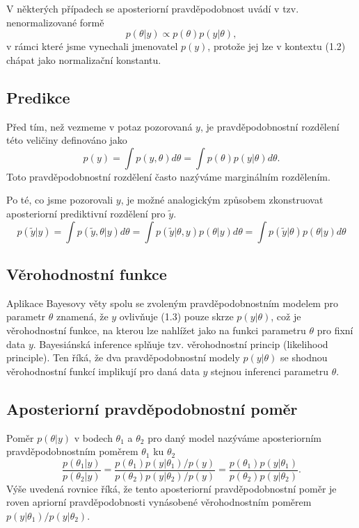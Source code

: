 V některých případech se aposteriorní pravděpodobnost uvádí v tzv. nenormalizované formě
\begin{equation}
p(\theta | y) \varpropto p(\theta)p(y|\theta),
\end{equation}
v rámci které jsme vynechali jmenovatel $p(y)$, protože jej lze v kontextu (1.2) chápat jako normalizační konstantu.

\subsection{Predikce}

Před tím, než vezmeme v potaz pozorovaná $y$, je pravděpodobnostní rozdělení této veličiny definováno jako
\begin{equation}
p(y) = \int p(y, \theta) d \theta = \int p(\theta) p(y | \theta) d \theta.
\end{equation}
Toto pravděpodobnostní rozdělení často nazýváme marginálním rozdělením.

Po té, co jsme pozorovali $y$, je možné analogickým způsobem zkonstruovat aposteriorní prediktivní rozdělení pro $\tilde{y}$.
\begin{equation}
p(\tilde{y} | y) = \int p(\tilde{y}, \theta | y) d \theta = \int p(\tilde{y} | \theta, y) p(\theta | y) d\theta = \int p(\tilde{y} | \theta) p(\theta|y) d\theta
\end{equation}

\subsection{Věrohodnostní funkce}

Aplikace Bayesovy věty spolu se zvoleným pravděpodobnostním modelem pro parametr $\theta$ znamená, že $y$ ovlivňuje (1.3) pouze skrze $p(y|\theta)$, což je věrohodnostní funkce, na kterou lze nahlížet jako na funkci parametru $\theta$ pro fixní data $y$. Bayesiánská inference splňuje tzv. věrohodnostní princip (likelihood principle). Ten říká, že dva pravděpodobnostní modely $p(y|\theta)$ se shodnou věrohodnostní funkcí implikují pro daná data $y$ stejnou inferenci parametru $\theta$.

\subsection{Aposteriorní pravděpodobnostní poměr}

Poměr $p(\theta | y)$ v bodech $\theta_1$ a $\theta_2$ pro daný model nazýváme aposteriorním pravděpodobnostním poměrem $\theta_1$ ku $\theta_2$
\begin{equation}
\frac{p(\theta_1 | y)}{p(\theta_2 | y)} = \frac{p(\theta_1)p(y | \theta_1) / p(y)}{p(\theta_2)p(y | \theta_2) / p(y)} = \frac{p(\theta_1)p(y | \theta_1)}{p(\theta_2)p(y | \theta_2)}.
\end{equation}
Výše uvedená rovnice říká, že tento aposteriorní pravděpodobnostní poměr je roven apriorní pravděpodobnosti vynásobené věrohodnostním poměrem $p(y | \theta_1) / p(y | \theta_2)$.

